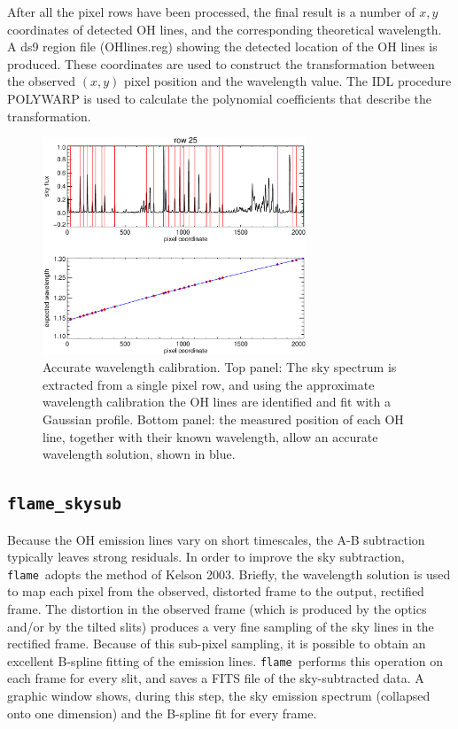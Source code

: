\documentclass[a4paper, notitlepage]{article}
\newcommand{\flame}{\texttt{flame}}
\begin{document}
After all the pixel rows have been processed, the final result is a number of $x,y$ coordinates of detected OH lines, and the corresponding theoretical wavelength. A ds9 region file (OHlines.reg) showing the detected location of the OH lines is produced. These coordinates are used to construct the transformation between the observed $(x,y)$ pixel position and the wavelength value. The IDL procedure POLYWARP is used to calculate the polynomial coefficients that describe the transformation.

\begin{figure}[tbp]
\centering
\includegraphics[width=0.7\textwidth]{wavecal_accurate}
\caption{Accurate wavelength calibration. Top panel: The sky spectrum is extracted from a single pixel row, and using the approximate wavelength calibration the OH lines are identified and fit with a Gaussian profile. Bottom panel: the measured position of each OH line, together with their known wavelength, allow an accurate wavelength solution, shown in blue.}
\label{fig:wavecal_accurate}
\end{figure}


\subsection{\texttt{flame\_skysub}}

Because the OH emission lines vary on short timescales, the A-B subtraction typically leaves strong residuals. In order to improve the sky subtraction, \flame\ adopts the method of Kelson 2003. Briefly, the wavelength solution is used to map each pixel from the observed, distorted frame to the output, rectified frame. The distortion in the observed frame (which is produced by the optics and/or by the tilted slits) produces a very fine sampling of the sky lines in the rectified frame. Because of this sub-pixel sampling, it is possible to obtain an excellent B-spline fitting of the emission lines. \flame\ performs this operation on each frame for every slit, and saves a FITS file of the sky-subtracted data. A graphic window shows, during this step, the sky emission spectrum (collapsed onto one dimension) and the B-spline fit for every frame.
\end{document}
